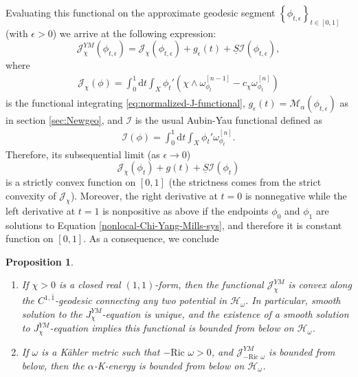 \documentclass[10pt, letterpaper]{amsart}
\theoremstyle{plain}
\newtheorem{prop}[theorem]{Proposition}
\theoremstyle{definition}
\numberwithin{equation}{section}
\begin{document}
Evaluating this functional on the approximate geodesic segment $\left\{ \phi_{t,\epsilon}\right\}_{t\in [0,1]}$ (with $\epsilon>0$) 
 we arrive at the following expression:
\begin{equation}
    \mathcal{J}_\chi^{YM}\left(\phi_{t,\epsilon}\right)
    =
    \mathcal{J}_\chi\left(\phi_{t,\epsilon}\right)+g_\epsilon(t)+\underline S \mathcal{I}(\phi_{t,\epsilon}),
\end{equation}
where 
\begin{align*}
    \mathcal{J}_\chi\left(\phi\right)
    =
    \int_0^1 \mathrm{d}t\int_X \phi_t'\left(\chi\wedge\omega_{\phi_t}^{[n-1]}-c_\chi\omega_{\phi_t}^{[n]}\right)
\end{align*}
is the functional integrating \eqref{eq:normalized-J-functional}, $g_\epsilon(t)=\mathcal{M}_\alpha(\phi_{t,\epsilon})$ as in section \ref{sec:Newgeo}, and $\mathcal{I}$ is the usual Aubin-Yau functional defined as
\begin{align*}
    \mathcal{I}(\phi)
    = 
    \int_0^1 \mathrm{d}t\int_X \phi_t'\omega_{\phi_t}^{[n]}.
\end{align*}
Therefore, its subsequential limit (as $\epsilon\to 0$)
\[
\mathcal{J}_\chi\left(\phi_t\right)+g(t)+\underline S \mathcal{I}(\phi_t)
\]
is a strictly convex function on $[0,1]$ (the strictness comes from the strict convexity of $\mathcal{J}_\chi$). Moreover, the right derivative at $t=0$ is nonnegative while the left derivative at $t=1$ is nonpositive as above if the endpoints $\phi_0$ and $\phi_1$ are solutions to Equation \eqref{nonlocal-Chi-Yang-Mills-sys}, and therefore it is constant function on $[0,1]$. As a consequence, we conclude

\begin{prop}~
  \begin{enumerate}
    \item 
    If $\chi>0$ is a closed real $(1,1)$-form, then the functional $\mathcal{J}_\chi^{YM}$ is convex along the $C^{1,\bar 1}$-geodesic connecting any two potential in $\mathcal{H}_\omega$. In particular, smooth solution to the $J_\chi^{YM}$-equation is unique, and the existence of a smooth solution to $J_\chi^{YM}$-equation implies this functional is bounded from below on $\mathcal{H}_\omega$. 
    \item
    If $\omega$ is a K\"ahler metric such that $-\text{Ric }\omega>0$, and $\mathcal{J}_{-\text{Ric }\omega}^{YM}$ is bounded from below, then the $\alpha$-K-energy is bounded from below on $\mathcal{H}_\omega$.
    \end{enumerate}
\end{prop}
\end{document}
